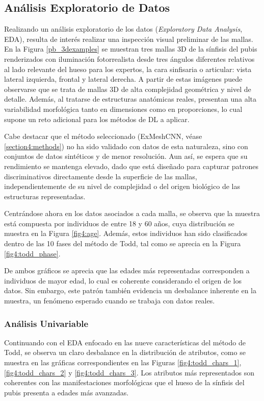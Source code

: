 \subsection{Análisis Exploratorio de Datos}
\label{section4:data_eda}
Realizando un análisis exploratorio de los datos (\textit{Exploratory Data Analysis}, EDA), resulta de interés realizar una inspección visual preliminar de las mallas. En la Figura \ref{pb_3dexamples} se muestran tres mallas 3D de la sínfisis del pubis renderizados con iluminación fotorrealista desde tres ángulos diferentes relativos al lado relevante del hueso para los expertos, la cara sinfisaria o articular: vista lateral izquierda, frontal y lateral derecha. A partir de estas imágenes puede observarse que se trata de mallas 3D de alta complejidad geométrica y nivel de detalle. Además, al tratarse de estructuras anatómicas reales, presentan una alta variabilidad morfológica tanto en dimensiones como en proporciones, lo cual supone un reto adicional para los métodos de DL a aplicar.

Cabe destacar que el método seleccionado (ExMeshCNN, véase \ref{section4:methods}) no ha sido validado con datos de esta naturaleza, sino con conjuntos de datos sintéticos y de menor resolución. Aun así, se espera que su rendimiento se mantenga elevado, dado que está diseñado para capturar patrones discriminativos directamente desde la superficie de las mallas, independientemente de su nivel de complejidad o del origen biológico de las estructuras representadas.

Centrándose ahora en los datos asociados a cada malla, se observa que la muestra está compuesta por individuos de entre 18 y 60 años, cuya distribución se muestra en la Figura \ref{fig4:age}. Además, estos individuos han sido clasificados dentro de las 10 fases del método de Todd, tal como se aprecia en la Figura \ref{fig4:todd_phase}.

De ambos gráficos se aprecia que las edades más representadas corresponden a individuos de mayor edad, lo cual es coherente considerando el origen de los datos. Sin embargo, este patrón también evidencia un desbalance inherente en la muestra, un fenómeno esperado cuando se trabaja con datos reales.

\subsubsection{Análisis Univariable}
Continuando con el EDA enfocado en las nueve características del método de Todd, se observa un claro desbalance en la distribución de atributos, como se muestra en las gráficas correspondientes en las Figuras \ref{fig4:todd_chars_1}, \ref{fig4:todd_chars_2} y \ref{fig4:todd_chars_3}. Los atributos más representados son coherentes con las manifestaciones morfológicas que el hueso de la sínfisis del pubis presenta a edades más avanzadas.

